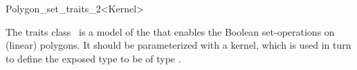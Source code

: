 \ccRefPageBegin

\begin{ccRefClass}{Polygon_set_traits_2<Kernel>}

\ccThreeToTwo

\ccDefinition
The traits class \ccRefName\ is a model of the 
that enables the Boolean set-operations on (linear) polygons.
It should be parameterized with a kernel, which is used in turn to
define the exposed type  to be of type
.

 
\ccIsModel

\end{ccRefClass}
\ccRefPageEnd
